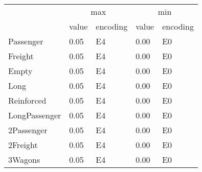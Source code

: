 \begin{tabular}{lllll}
\toprule
 & \multicolumn{2}{c}{max} & \multicolumn{2}{c}{min} \\
 & value & encoding & value & encoding \\
\midrule
Passenger             & 0.05 & E4  & 0.00 & E0  \\
Freight               & 0.05 & E4  & 0.00 & E0  \\
Empty                 & 0.05 & E4  & 0.00 & E0  \\
Long                  & 0.05 & E4  & 0.00 & E0  \\
Reinforced            & 0.05 & E4  & 0.00 & E0  \\
LongPassenger         & 0.05 & E4  & 0.00 & E0  \\
2Passenger            & 0.05 & E4  & 0.00 & E0  \\
2Freight              & 0.05 & E4  & 0.00 & E0  \\
3Wagons & 0.05 & E4  & 0.00 & E0  \\
\bottomrule
\end{tabular}
